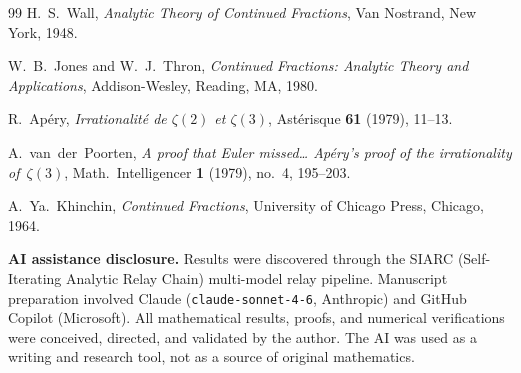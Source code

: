 \documentclass[12pt, reqno]{amsart}
\theoremstyle{definition}
\theoremstyle{remark}
\begin{document}
\begin{thebibliography}{99}
H.~S.~Wall,
\emph{Analytic Theory of Continued Fractions},
Van Nostrand, New York, 1948.

W.~B.~Jones and W.~J.~Thron,
\emph{Continued Fractions: Analytic Theory and Applications},
Addison-Wesley, Reading, MA, 1980.

R.~Ap\'ery,
\emph{Irrationalit\'e de $\zeta(2)$ et $\zeta(3)$},
Ast\'erisque \textbf{61} (1979), 11--13.

A.~van~der~Poorten,
\emph{A proof that Euler missed\ldots{}
Ap\'ery's proof of the irrationality of~$\zeta(3)$},
Math.\ Intelligencer \textbf{1} (1979), no.~4, 195--203.

A.~Ya.~Khinchin,
\emph{Continued Fractions},
University of Chicago Press, Chicago, 1964.

\end{thebibliography}

\medskip
\noindent\textbf{AI assistance disclosure.}
Results were discovered through the SIARC
(Self-Iterating Analytic Relay Chain) multi-model
relay pipeline. Manuscript preparation involved
Claude (\texttt{claude-sonnet-4-6}, Anthropic)
and GitHub Copilot (Microsoft). All mathematical
results, proofs, and numerical verifications were
conceived, directed, and validated by the author.
The AI was used as a writing and research tool,
not as a source of original mathematics.
\end{document}
